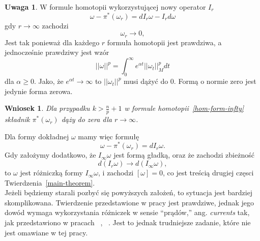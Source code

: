 \documentclass[licencjacka]{pracamgr}
\theoremstyle{definition}
\theoremstyle{definition}
\newtheorem{remark}{Uwaga}[section]
\theoremstyle{plain}
\theoremstyle{plain}
\theoremstyle{plain}
\theoremstyle{plain}
\theoremstyle{plain}
\newtheorem{wniosek}{Wniosek}[section]
\begin{document}
\begin{remark}
W formule homotopii wykorzystującej nowy operator $I_r$
\begin{equation}\label{hom-form-infty}
    \omega - \pi^\ast(\omega_r) = dI_r \omega - I_r d\omega
\end{equation}
gdy $r \to \infty$ zachodzi 
\[
 \omega_r  \to 0, 
\]
Jest tak ponieważ dla każdego $r$ formuła homotopii jest prawdziwa, a
jednocześnie prawdziwy jest wzór
\[
|| \omega ||^p = \int_0^\infty e^{\alpha t} || \omega_t ||^p_M dt
\]
 dla $\alpha \geq 0$. Jako, że $e^{\alpha t} \to \infty$ to $|| \omega_t ||^p$
musi dążyć do 0.  Formą o normie zero jest jedynie forma zerowa.
\end{remark}


\begin{wniosek}\label{asymtpotic-s-null-operator}
Dla przypadku $k > \frac{n}{p} + 1$ w formule homotopii~\ref{hom-form-infty}
składnik $\pi^\ast(\omega_r)$ dąży do zera dla $r \to \infty$.
\end{wniosek}

Dla formy dokładnej $\omega$ mamy więc formułę
\[
    \omega - \pi^\ast(\omega_r) = dI_r \omega.
\]
Gdy założymy dodatkowo, że $I_\infty\omega$ jest formą gładką, oraz że zachodzi
zbieżność
\[
d\left( I_r \omega \right) \to d (I_\infty \omega),
\]
to $\omega$ jest różniczką formy $I_\infty \omega$, i zachodzi $[\omega] = 0$, co jest
treścią drugiej częsci Twierdzenia~\ref{main-theorem}. \\

Jeżeli będziemy starali pozbyć się powyższych założeń, to sytuacja jest
bardziej skomplikowana. Twierdzenie przedstawione w pracy jest prawdziwe,
jednak jego dowód  wymaga wykorzystania różniczek w sensie ``prądów,'' ang.
\emph{currents} tak, jak przedstawiono w pracach ~\cite{cheeger},
~\cite{weber}. Jest to jednak trudniejsze zadanie, które nie jest omawiane w
tej pracy. \\
\end{document}
